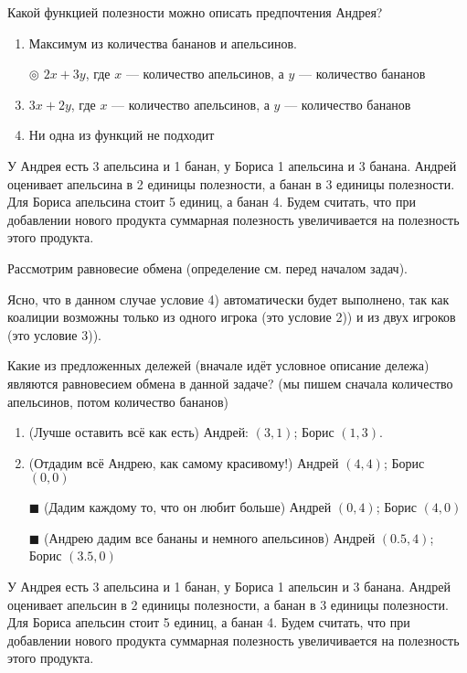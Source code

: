 Какой функцией полезности можно описать предпочтения Андрея?

\begin{enumerate}[label=$\circ$]	%
	\item Максимум из количества бананов и апельсинов.
	\item[$\circledcirc$] $2x+3y$, где $x$ --- количество апельсинов, а $y$ --- количество бананов
	\item $3 x + 2y$, где $x$ --- количество апельсинов, а $y$ --- количество бананов
	\item Ни одна из функций не подходит
\end{enumerate}

\task
У Андрея есть 3 апельсина и 1 банан, у Бориса 1 апельсина и 3 банана. Андрей оценивает апельсина в 2 единицы полезности, а банан в 3 единицы полезности. Для Бориса апельсина стоит 5 единиц, а банан 4. Будем считать, что при добавлении нового продукта суммарная полезность увеличивается на полезность этого продукта.

Рассмотрим равновесие обмена (определение см. перед началом задач).

Ясно, что в данном случае условие 4) автоматически будет выполнено, так как коалиции возможны только из одного игрока (это условие 2)) и из двух игроков (это условие 3)).

Какие из предложенных дележей (вначале идёт условное описание дележа) являются равновесием обмена в данной задаче? (мы пишем сначала количество апельсинов, потом количество бананов)

\begin{enumerate}[label=$\square$] %
	\item (Лучше оставить всё как есть) Андрей: $(3,1)$; Борис $(1,3)$.
	\item (Отдадим всё Андрею, как самому красивому!) Андрей $(4,4)$; Борис $(0,0)$
	\item[$\blacksquare$] (Дадим каждому то, что он любит больше) Андрей $(0,4)$; Борис $(4,0)$
	\item[$\blacksquare$] (Андрею дадим все бананы и немного апельсинов) Андрей $(0.5,4)$; Борис $(3.5,0)$
\end{enumerate}

\task
У Андрея есть 3 апельсина и 1 банан, у Бориса 1 апельсин и 3 банана. Андрей оценивает апельсин в 2 единицы полезности, а банан в 3 единицы полезности. Для Бориса апельсин стоит 5 единиц, а банан 4. Будем считать, что при добавлении нового продукта суммарная полезность увеличивается на полезность этого продукта.

